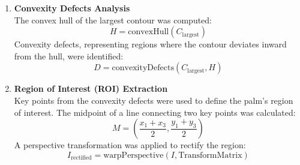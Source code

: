 \begin{enumerate}
    \item \textbf{Convexity Defects Analysis} \\
    The convex hull of the largest contour was computed:
    \[
    H = \text{convexHull}(C_{\text{largest}})
    \]
    Convexity defects, representing regions where the contour deviates inward from the hull, were identified:
    \[
    D = \text{convexityDefects}(C_{\text{largest}}, H)
    \]

    \item \textbf{Region of Interest (ROI) Extraction} \\
    Key points from the convexity defects were used to define the palm's region of interest. The midpoint of a line connecting two key points was calculated:
    \[
    M = \left(\frac{x_1 + x_3}{2}, \frac{y_1 + y_3}{2}\right)
    \]
    A perspective transformation was applied to rectify the region:
    \[
    I_{\text{rectified}} = \text{warpPerspective}(I, \text{TransformMatrix})
    \]


\end{enumerate}
